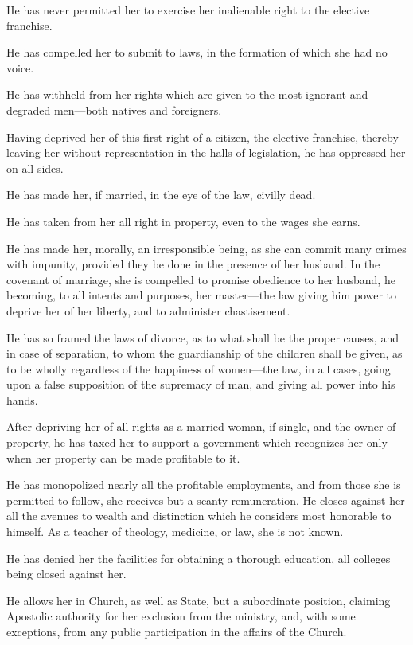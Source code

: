 He has never permitted her to exercise her inalienable right to the
elective franchise.

He has compelled her to submit to laws, in the formation of which she
had no voice.

He has withheld from her rights which are given to the most ignorant
and degraded men---both natives and foreigners.

Having deprived her of this first right of a citizen, the elective
franchise, thereby leaving her without representation in the halls of
legislation, he has oppressed her on all sides.

He has made her, if married, in the eye of the law, civilly dead.

He has taken from her all right in property, even to the wages she
earns.

He has made her, morally, an irresponsible being, as she can commit
many crimes with impunity, provided they be done in the presence of
her husband. In the covenant of marriage, she is compelled to promise
obedience to her husband, he becoming, to all intents and purposes,
her master---the law giving him power to deprive her of her liberty,
and to administer chastisement.

He has so framed the laws of divorce, as to what shall be the
proper causes, and in case of separation, to whom the guardianship of
the children shall be given, as to be wholly regardless of the
happiness of women---the law, in all cases, going upon a false
supposition of the supremacy of man, and giving all power into his
hands.

After depriving her of all rights as a married woman, if single, and
the owner of property, he has taxed her to support a government which
recognizes her only when her property can be made profitable to it.

He has monopolized nearly all the profitable employments, and from
those she is permitted to follow, she receives but a scanty
remuneration. He closes against her all the avenues to wealth and
distinction which he considers most honorable to himself. As a teacher
of theology, medicine, or law, she is not known.

He has denied her the facilities for obtaining a thorough education,
all colleges being closed against her.

He allows her in Church, as well as State, but a subordinate position,
claiming Apostolic authority for her exclusion from the ministry, and,
with some exceptions, from any public participation in the affairs
of the Church.

